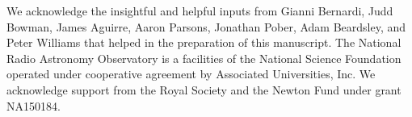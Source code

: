 \documentclass[
reprint,
superscriptaddress,
amsmath,
amssymb,
aps,
prd
]{revtex4-1}
\begin{document}
\begin{acknowledgments}
We acknowledge the insightful and helpful inputs from Gianni Bernardi, Judd Bowman, James Aguirre, Aaron Parsons, Jonathan Pober, Adam Beardsley, and Peter Williams that helped in the preparation of this manuscript. The National Radio Astronomy Observatory is a facilities of the National Science Foundation operated under cooperative agreement by Associated Universities, Inc. We acknowledge support from the Royal Society and the Newton Fund under grant NA150184.
\end{acknowledgments}





\end{document}
